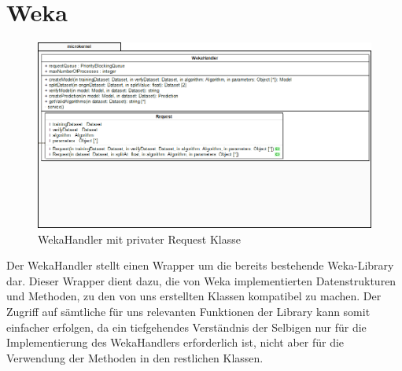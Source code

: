 \section{Weka}

\begin{figure}[h]
\centering
\includegraphics[width=1.0\linewidth]{Grafik/Klassendiagramme/Weka.png}
\caption{WekaHandler mit privater Request Klasse}
\end{figure}


Der WekaHandler stellt einen Wrapper um die bereits bestehende Weka-Library dar. Dieser Wrapper dient dazu, die von Weka implementierten Datenstrukturen und Methoden, zu den von uns erstellten Klassen kompatibel zu machen. Der Zugriff auf sämtliche für uns relevanten Funktionen der Library kann somit einfacher erfolgen, da ein tiefgehendes Verständnis der Selbigen nur für die Implementierung des WekaHandlers erforderlich ist, nicht aber für die Verwendung der Methoden in den restlichen Klassen.
